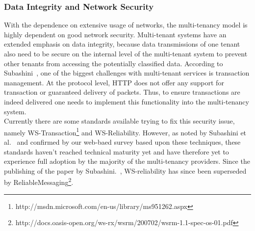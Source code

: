 \subsubsection{Data Integrity and Network Security}
With the dependence on extensive usage of networks, the multi-tenancy model is highly dependent on good network security.  
Multi-tenant systems have an extended emphasis on data integrity, because data transmissions of one tenant also need to be secure on the internal level of the multi-tenant system to prevent other tenants from accessing the potentially classified data.
According to Subashini~\cite{Subashini2011Security}, one of the biggest challenges with multi-tenant services is transaction management. 
At the protocol level, HTTP does not offer any support for transaction or guaranteed delivery of packets. 
Thus, to ensure transactions are indeed delivered one needs to implement this functionality into the multi-tenancy system.\\

Currently there are some standards available trying to fix this security issue, namely WS-Transaction\footnote{http://msdn.microsoft.com/en-us/library/ms951262.aspx} and WS-Reliability.
However, as noted by Subashini et al.~\cite{Subashini2011Security} and confirmed by our web-baed survey based upon these techniques, these standards haven’t reached technical maturity yet and have therefore yet to experience full adoption by the majority of the multi-tenancy providers.
Since the publishing of the paper by Subashini.~\cite{Subashini2011Security}, WS-reliability has since been superseded by ReliableMessaging\footnote{http://docs.oasis-open.org/ws-rx/wsrm/200702/wsrm-1.1-spec-os-01.pdf}.

